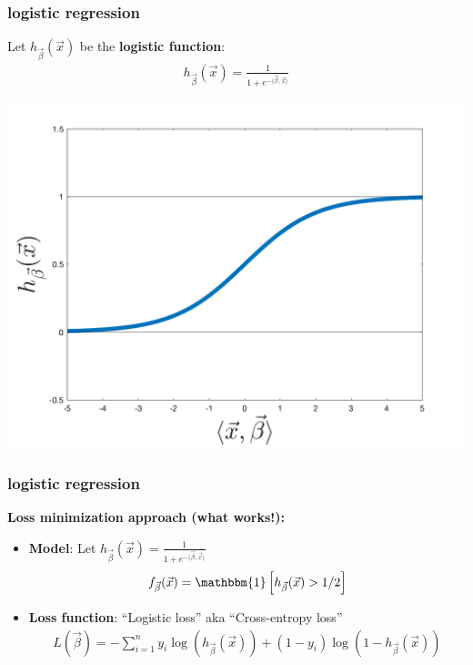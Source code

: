 \documentclass[handout,compress]{beamer}
\begin{document}
\begin{frame}[t]
	\frametitle{logistic regression}
	Let $h_{\vec{\beta}}(\vec{x})$ be the \textbf{\alert{logistic function}}:
	\begin{align*}
	h_{\vec{\beta}}(\vec{x}) = \frac{1}{1 + e^{-\langle\vec{\beta},\vec{x}\rangle}}
	\end{align*}
	\begin{center}
		\includegraphics[width=.66\textwidth]{logistic_function.png}
	\end{center}
\end{frame}

\begin{frame}
	\frametitle{logistic regression}
	\textbf{Loss minimization approach (what works!):}
	\begin{itemize}
		\item \textbf{Model}: Let $h_{\vec{\beta}}(\vec{x}) = \frac{1}{1 + e^{-\langle\vec{\beta},\vec{x}\rangle}}$
		\begin{align*}
		f_{\vec{\beta}}(\vec{x}) = \mathbbm{1}\left[h_{\vec{\beta}}(\vec{x})  > 1/2\right]
		\end{align*}
		\item \textbf{Loss function}: ``Logistic loss'' aka ``Cross-entropy loss''
		\begin{align*}
		L(\vec{\beta}) = - \sum_{i=1}^n y_i \log(h_{\vec{\beta}}(\vec{x})) + (1-y_i) \log(1 - h_{\vec{\beta}}(\vec{x})) 
		\end{align*}
	\end{itemize}
\vspace{1em}

\end{frame}
\end{document}
